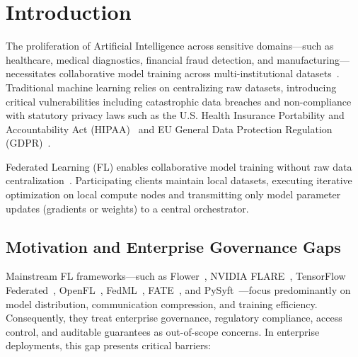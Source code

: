 \section{Introduction}

The proliferation of Artificial Intelligence across sensitive domains—such as healthcare, medical diagnostics, financial fraud detection, and manufacturing—necessitates collaborative model training across multi-institutional datasets~\cite{rieke2020future}. Traditional machine learning relies on centralizing raw datasets, introducing critical vulnerabilities including catastrophic data breaches and non-compliance with statutory privacy laws such as the U.S. Health Insurance Portability and Accountability Act (HIPAA)~\cite{hipaa2003security} and EU General Data Protection Regulation (GDPR)~\cite{gdpr2016regulation}.

Federated Learning (FL) enables collaborative model training without raw data centralization~\cite{mcmahan2017communication, kairouz2021advances}. Participating clients maintain local datasets, executing iterative optimization on local compute nodes and transmitting only model parameter updates (gradients or weights) to a central orchestrator.

\subsection{Motivation and Enterprise Governance Gaps}

Mainstream FL frameworks—such as Flower~\cite{beutel2020flower}, NVIDIA FLARE~\cite{roth2022nvidia}, TensorFlow Federated~\cite{kairouz2021advances}, OpenFL~\cite{foley2022openfl}, FedML~\cite{he2020fedml}, FATE~\cite{yang2019fate}, and PySyft~\cite{ryffel2018generic}—focus predominantly on model distribution, communication compression, and training efficiency. Consequently, they treat enterprise governance, regulatory compliance, access control, and auditable guarantees as out-of-scope concerns. In enterprise deployments, this gap presents critical barriers:

